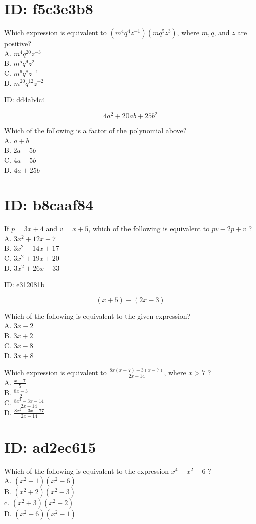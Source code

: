 
\section*{ID: f5c3e3b8}
Which expression is equivalent to $\left(m^{4} q^{4} z^{-1}\right)\left(m q^{5} z^{3}\right)$, where $m, q$, and $z$ are positive?\\
A. $m^{4} q^{20} z^{-3}$\\
B. $m^{5} q^{9} z^{2}$\\
C. $m^{6} q^{8} z^{-1}$\\
D. $m^{20} q^{12} z^{-2}$

ID: dd4ab4c4

$$
4 a^{2}+20 a b+25 b^{2}
$$

Which of the following is a factor of the polynomial above?\\
A. $a+b$\\
B. $2 a+5 b$\\
C. $4 a+5 b$\\
D. $4 a+25 b$

\section*{ID: b8caaf84}
If $p=3 x+4$ and $v=x+5$, which of the following is equivalent to $p v-2 p+v$ ?\\
A. $3 x^{2}+12 x+7$\\
B. $3 x^{2}+14 x+17$\\
C. $3 x^{2}+19 x+20$\\
D. $3 x^{2}+26 x+33$

ID: e312081b

$$
(x+5)+(2 x-3)
$$

Which of the following is equivalent to the given expression?\\
A. $3 x-2$\\
B. $3 x+2$\\
C. $3 x-8$\\
D. $3 x+8$

Which expression is equivalent to $\frac{8 x(x-7)-3(x-7)}{2 x-14}$, where $x>7$ ?\\
A. $\frac{x-7}{5}$\\
B. $\frac{8 x-3}{2}$\\
C. $\frac{8 x^{2}-3 x-14}{2 x-14}$\\
D. $\frac{8 x^{2}-3 x-77}{2 x-14}$

\section*{ID: ad2ec615}
Which of the following is equivalent to the expression $x^{4}-x^{2}-6$ ?\\
A. $\left(x^{2}+1\right)\left(x^{2}-6\right)$\\
B. $\left(x^{2}+2\right)\left(x^{2}-3\right)$\\
c. $\left(x^{2}+3\right)\left(x^{2}-2\right)$\\
D. $\left(x^{2}+6\right)\left(x^{2}-1\right)$

